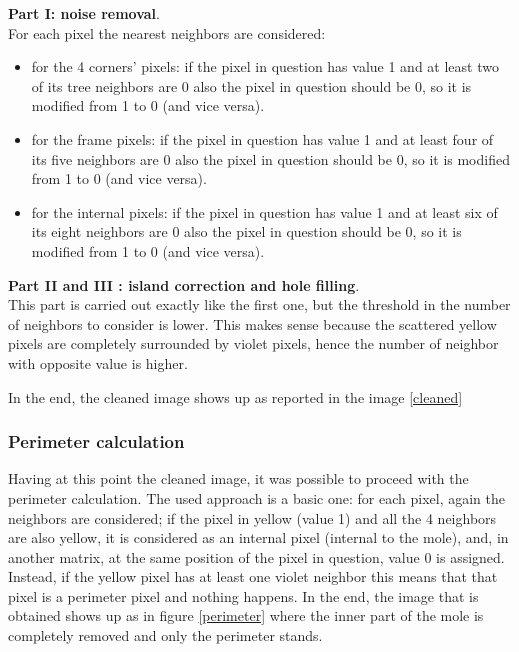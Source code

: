 \documentclass[a4paper,12pt,oneside,titlepage]{article}
\begin{document}
	\textbf{Part I: noise removal}.\\
	For each pixel the nearest neighbors are considered: 
	\begin{itemize}
		\item for the 4 corners' pixels: if the pixel in question has value 1 and at least two of its tree neighbors are 0 also the pixel in question should be 0, so it is modified from 1 to 0 (and vice versa). 
		\item for the frame pixels: if the pixel in question has value 1 and at least four of its five neighbors are 0 also the pixel in question should be 0, so it is modified from 1 to 0 (and vice versa). 
		\item for the internal pixels: if the pixel in question has value 1 and at least six of its eight neighbors are 0 also the pixel in question should be 0, so it is modified from 1 to 0 (and vice versa).  
	\end{itemize}
	
	\textbf{Part II and III : island correction and hole filling}.\\
	This part is carried out exactly like the first one, but the threshold in the number of neighbors to consider is lower. This makes sense because the scattered yellow pixels  are completely surrounded  by violet pixels, hence the number of neighbor with opposite value is higher. 
	
	In the end, the cleaned image shows up as reported in the image \ref{cleaned}
	
	
	
	\subsubsection{Perimeter calculation}
	Having at this point the cleaned image, it was possible to proceed with the perimeter calculation. The used approach is a basic one: for each pixel, again the neighbors are considered; if the pixel in yellow (value 1) and all the 4 neighbors are also yellow, it is considered as an internal pixel (internal to the mole), and, in another matrix, at the same position of the pixel in question, value 0 is assigned. Instead, if the yellow pixel has at least one violet neighbor this means that that pixel is a perimeter pixel and nothing happens.
	In the end, the image that is obtained shows up as in figure \ref{perimeter} where the inner part of the mole is completely removed and only the perimeter stands.
	
\end{document}
